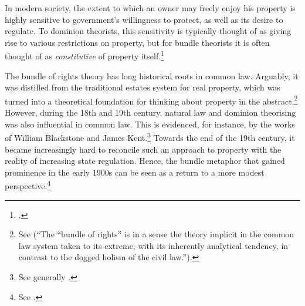In modern society, the extent to which an owner may freely enjoy his property is highly sensitive to government's willingness to protect, as well as its desire to regulate. To dominion theorists, this sensitivity is typically thought of as giving rise to various restrictions on property, but for bundle theorists it is often thought of as {\it constitutive} of property itself.\footcite[7]{chang12} 

The bundle of rights theory has long historical roots in common law. Arguably, it was distilled from the traditional estates system for real property, which was turned into a theoretical foundation for thinking about property in the abstract.\footnote{See \cite[7]{chang12} (``The ``bundle of rights'' is in a sense the theory implicit in the common law system taken to its extreme, with its inherently analytical tendency, in contrast to the dogged holism of the civil law.'').} However, during the 18th and 19th century, natural law and dominion theorising was also influential in common law. This is evidenced, for instance, by the works of William Blackstone and James Kent.\footnote{See generally \cite{blackstone79b,kent27}.} Towards the end of the 19th century, it became increasingly hard to reconcile such an approach to property with the reality of increasing state regulation. Hence, the bundle metaphor that gained prominence in the early 1900s can be seen as a return to a more modest perspective.\footnote{See \cite[195]{klein11}.}

